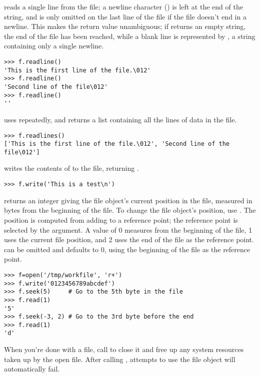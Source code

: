\documentclass{manual}
\begin{document}
 reads a single line from the file; a newline
character () is left at the end of the string, and is only
omitted on the last line of the file if the file doesn't end in a
newline.  This makes the return value unambiguous; if
 returns an empty string, the end of the file has
been reached, while a blank line is represented by , a
string containing only a single newline.  

\begin{verbatim}
>>> f.readline()
'This is the first line of the file.\012'
>>> f.readline()
'Second line of the file\012'
>>> f.readline()
''
\end{verbatim}

 uses  repeatedly, and returns
a list containing all the lines of data in the file.

\begin{verbatim}
>>> f.readlines()
['This is the first line of the file.\012', 'Second line of the file\012']
\end{verbatim}

 writes the contents of  to
the file, returning .  

\begin{verbatim}
>>> f.write('This is a test\n')
\end{verbatim}

 returns an integer giving the file object's current
position in the file, measured in bytes from the beginning of the
file.  To change the file object's position, use
.  The position is
computed from adding  to a reference point; the reference
point is selected by the  argument.  A 
value of 0 measures from the beginning of the file, 1 uses the current
file position, and 2 uses the end of the file as the reference point.
 can be omitted and defaults to 0, using the beginning
of the file as the reference point.

\begin{verbatim}
>>> f=open('/tmp/workfile', 'r+')
>>> f.write('0123456789abcdef')
>>> f.seek(5)     # Go to the 5th byte in the file
>>> f.read(1)        
'5'
>>> f.seek(-3, 2) # Go to the 3rd byte before the end
>>> f.read(1)
'd'
\end{verbatim}

When you're done with a file, call  to close it and
free up any system resources taken up by the open file.  After calling
, attempts to use the file object will automatically fail.
\end{document}
